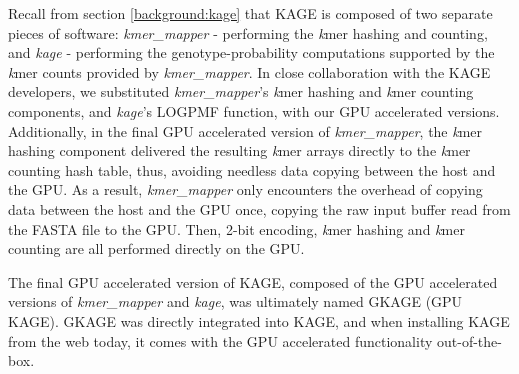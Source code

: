 Recall from section \ref{background:kage} that KAGE is composed of two separate pieces of software: \textit{kmer\_mapper} - performing the \textit{k}mer hashing and counting, and \textit{kage} - performing the genotype-probability computations supported by the \textit{k}mer counts provided by \textit{kmer\_mapper}.
In close collaboration with the KAGE developers, we substituted \textit{kmer\_mapper}'s \textit{k}mer hashing and \textit{k}mer counting components, and \textit{kage}'s LOGPMF function, with our GPU accelerated versions.
Additionally, in the final GPU accelerated version of \textit{kmer\_mapper}, the \textit{k}mer hashing component delivered the resulting \textit{k}mer arrays directly to the \textit{k}mer counting hash table, thus, avoiding needless data copying between the host and the GPU.
As a result, \textit{kmer\_mapper} only encounters the overhead of copying data between the host and the GPU once, copying the raw input buffer read from the FASTA file to the GPU. 
Then, 2-bit encoding, \textit{k}mer hashing and \textit{k}mer counting are all performed directly on the GPU.

The final GPU accelerated version of KAGE, composed of the GPU accelerated versions of \textit{kmer\_mapper} and \textit{kage}, was ultimately named GKAGE (GPU KAGE).
GKAGE was directly integrated into KAGE, and when installing KAGE from the web today, it comes with the GPU accelerated functionality out-of-the-box.

